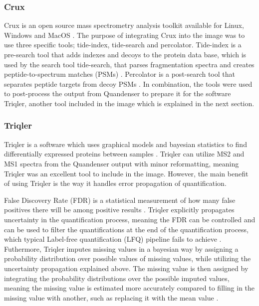 \subsubsection{Crux}
Crux is an open source mass spectrometry analysis toolkit available for Linux, Windows and MacOS \cite{crux}. The purpose of integrating Crux into the image was to use three specific tools; tide-index, tide-search and percolator. Tide-index is a pre-search tool that adds indexes and decoys to the protein data base, which is used by the search tool tide-search, that parses fragmentation spectra and creates peptide-to-spectrum matches (PSMs) \cite{tide-search}. Percolator is a post-search tool that separates peptide targets from decoy PSMs \cite{percolator}. In combination, the tools were used to post-process the output from Quandenser to prepare it for the software Triqler, another tool included in the image which is explained in the next section.

\subsubsection{Triqler}  \label{ssec:triqler}
Triqler is a software which uses graphical models and bayesian statistics to find differentially expressed proteins between samples \cite{triqler}. Triqler can utilize MS2 and MS1 spectra from the Quandenser output with minor reformatting, meaning Triqler was an excellent tool to include in the image. However, the main benefit of using Triqler is the way it handles error propagation of quantification.

False Discovery Rate (FDR) is a statistical measurement of how many false positives there will be among positive results \cite{fdr}.  Triqler explicitly propagates uncertainty in the quantification process, meaning the FDR can be controlled and can be used to filter the quantifications at the end of the quantification process, which typical Label-free quantification (LFQ) pipeline fails to achieve \cite{triqler}. Futhermore, Triqler imputes missing values in a bayesian way by assigning a probability distribution over possible values of missing values, while utilizing the uncertainty propagation explained above. The missing value is then assigned by integrating the probability distributions over the possible imputed values, meaning the missing value is estimated more accurately compared to filling in the missing value with another, such as replacing it with the mean value \cite{triqler}.

